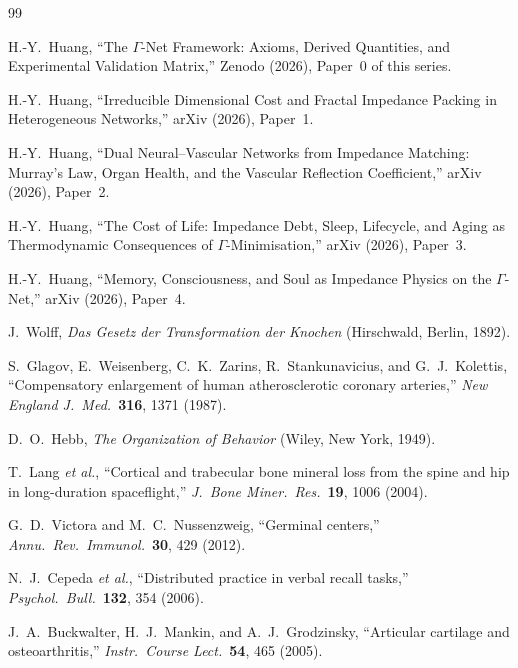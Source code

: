 \documentclass[aps,pre,twocolumn,superscriptaddress,floatfix]{revtex4-2}
\begin{document}
\begin{thebibliography}{99}

H.-Y.~Huang, ``The $\Gamma$-Net Framework: Axioms, Derived
Quantities, and Experimental Validation Matrix,''
Zenodo (2026), Paper~0 of this series.

H.-Y.~Huang, ``Irreducible Dimensional Cost and Fractal
Impedance Packing in Heterogeneous Networks,''
arXiv (2026), Paper~1.

H.-Y.~Huang, ``Dual Neural--Vascular Networks from Impedance
Matching: Murray's Law, Organ Health, and the Vascular
Reflection Coefficient,'' arXiv (2026), Paper~2.

H.-Y.~Huang, ``The Cost of Life: Impedance Debt, Sleep,
Lifecycle, and Aging as Thermodynamic Consequences of
$\Gamma$-Minimisation,'' arXiv (2026), Paper~3.

H.-Y.~Huang, ``Memory, Consciousness, and Soul as Impedance
Physics on the $\Gamma$-Net,'' arXiv (2026), Paper~4.

J.~Wolff, \emph{Das Gesetz der Transformation der Knochen}
(Hirschwald, Berlin, 1892).

S.~Glagov, E.~Weisenberg, C.~K.~Zarins, R.~Stankunavicius,
and G.~J.~Kolettis, ``Compensatory enlargement of human
atherosclerotic coronary arteries,''
\emph{New England J.\ Med.}\ \textbf{316}, 1371 (1987).

D.~O.~Hebb, \emph{The Organization of Behavior}
(Wiley, New York, 1949).

T.~Lang \emph{et al.}, ``Cortical and trabecular bone
mineral loss from the spine and hip in long-duration
spaceflight,'' \emph{J.\ Bone Miner.\ Res.}\ \textbf{19},
1006 (2004).

G.~D.~Victora and M.~C.~Nussenzweig, ``Germinal centers,''
\emph{Annu.\ Rev.\ Immunol.}\ \textbf{30}, 429 (2012).

N.~J.~Cepeda \emph{et al.}, ``Distributed practice in
verbal recall tasks,'' \emph{Psychol.\ Bull.}\ \textbf{132},
354 (2006).

J.~A.~Buckwalter, H.~J.~Mankin, and A.~J.~Grodzinsky,
``Articular cartilage and osteoarthritis,''
\emph{Instr.\ Course Lect.}\ \textbf{54}, 465 (2005).


\end{thebibliography}
\end{document}

